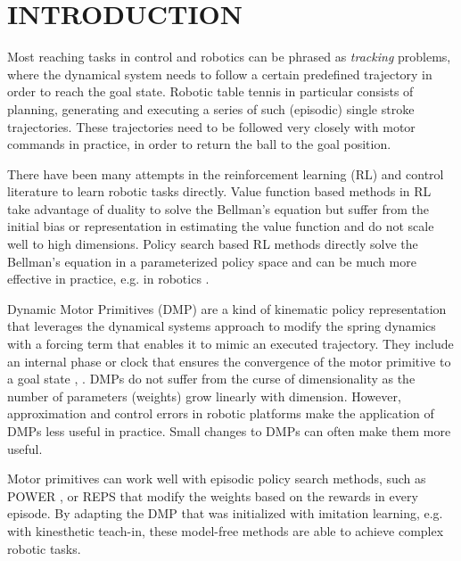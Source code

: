 \section{INTRODUCTION}\label{introduction}


Most reaching tasks in control and robotics can be phrased as \emph{tracking} problems, where the dynamical system needs to follow a certain predefined trajectory in order to reach the goal state. Robotic table tennis in particular \cite{Muelling_IJRR_2013} consists of planning, generating and executing a series of such (episodic) single stroke trajectories. These trajectories need to be followed very closely with motor commands in practice, in order to return the ball to the goal position. 

There have been many attempts in the reinforcement learning (RL) \cite{Sutton98} and control literature to learn robotic tasks directly. Value function based methods in RL take advantage of duality to solve the Bellman's equation but suffer from the initial bias or representation in estimating the value function and do not scale well to high dimensions. Policy search based RL methods directly solve the Bellman's equation in a parameterized policy space and can be much more effective in practice, e.g. in robotics \cite{Kober13}. 

Dynamic Motor Primitives (DMP) are a kind of kinematic policy representation that leverages the dynamical systems approach to modify the spring dynamics with a forcing term that enables it to mimic an executed trajectory. They include an internal phase or clock that ensures the convergence of the motor primitive to a goal state \cite{Ijspeert13}, \cite{Schaal07}. DMPs do not suffer from the curse of dimensionality as the number of parameters (weights) grow linearly with dimension. However, approximation and control errors in robotic platforms make the application of DMPs less useful in practice. Small changes to DMPs can often make them more useful.


Motor primitives can work well with episodic policy search methods, such as POWER \cite{Kober08}, or REPS \cite{Peter10} that modify the weights based on the rewards in every episode. By adapting the DMP that was initialized with imitation learning, e.g. with kinesthetic teach-in, these model-free methods are able to achieve complex robotic tasks.

